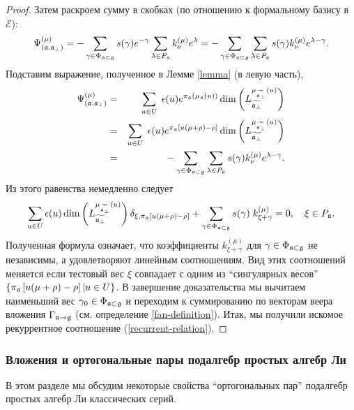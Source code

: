 \begin{proof}
Затем раскроем сумму в скобках (по отношению к формальному базису в  $\mathcal{E}$):
\begin{equation*}
\Psi ^{\left( \mu \right) }_{\left(  \af, \afb \right)}
=-\sum_{\gamma \in \Phi _{\af\subset \gf}}s(\gamma
)e^{-\gamma }\sum_{\lambda \in P_{\af}}k_{\nu }^{(\mu )}e^{\lambda
}=-\sum_{\gamma \in \Phi _{\af\subset \gf}}\sum_{\lambda \in P_{%
\af}}s(\gamma )k_{\nu }^{(\mu )}e^{\lambda -\gamma }.
\end{equation*}
Подставим выражение, полученное в Лемме \ref{lemma} (в левую часть),
\begin{eqnarray*}
\Psi ^{\left( \mu \right) }_{\left(  \af, \afb \right)}
&=&\sum_{u\in U}\;\epsilon (u)e^{\pi _{\af}\left( \mu _{\frak{a%
}}\left( u\right) \right) }\dim \left( L_{\widetilde{\af_{\perp }}%
}^{\mu _{\widetilde{\af_{\perp }}}\left( u\right) }\right)
\label{anom modules 2} \\
&=&\sum_{u\in U}\;\epsilon (u)e^{\pi _{\af}\left[ u(\mu +\rho )-\rho %
\right] }\dim \left( L_{\widetilde{\af_{\perp }}}^{\mu _{\widetilde{%
\af_{\perp }}}\left( u\right) }\right)  \\
&=&-\sum_{\gamma \in \Phi _{\af\subset \gf}}\sum_{\lambda \in P_{%
\af}}s(\gamma )k_{\nu }^{(\mu )}e^{\lambda -\gamma }.
\end{eqnarray*}
Из этого равенства немедленно следует
\begin{equation}
\sum_{u\in U}\epsilon (u)\dim \left( L_{\widetilde{\af_{\perp }}}^{\mu
_{\widetilde{\af_{\perp }}}\left( u\right) }\right) \delta _{\xi ,\pi _{%
\af}\left[ u(\mu +\rho )-\rho \right] }+\sum_{\gamma \in \Phi _{\af%
\subset \gf}}s(\gamma )\;k_{\xi +\gamma }^{(\mu )}=0,\quad \xi \in P_{%
\af}.  \label{eq:121}
\end{equation}
Полученная формула означает, что коэффициенты  $k_{\xi +\gamma }^{(\mu )}$ для  $\gamma \in \Phi _{\mathfrak{a}\subset \mathfrak{g}}$ не независимы, а удовлетворяют линейным соотношениям. Вид этих соотношений меняется если тестовый вес  $\xi $ совпадает с одним из ``сингулярных весов''   $\left\{ \pi _{\mathfrak{a}}\left[ u(\mu +\rho )-\rho \right] |u\in U\right\} $. В завершение доказательства мы вычитаем наименьший вес  $\gamma _{0}\in \Phi _{\mathfrak{a}\subset \mathfrak{g}}$ и переходим к суммированию по векторам веера вложения $\Gamma _{\mathfrak{a}\rightarrow \mathfrak{g}}$ (см. определение \ref{fan-definition}). Итак, мы получили искомое рекуррентное соотношение  (\ref{recurrent-relation}).
\end{proof}

\subsubsection{Вложения и ортогональные пары подалгебр простых алгебр Ли}
\label{sect-embeddings}
В этом разделе мы обсудим некоторые свойства ``ортогональных пар'' подалгебр простых алгебр Ли классических серий. 

